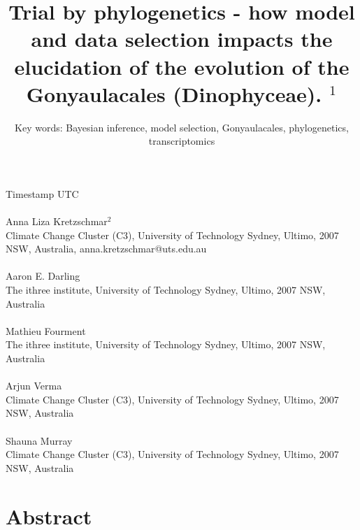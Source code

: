 \documentclass[12pt]{article}
\title{Trial by phylogenetics - how model and data selection impacts the elucidation of the evolution of the Gonyaulacales (Dinophyceae). $^{1}$}
\author{Key words: Bayesian inference, model selection, Gonyaulacales, phylogenetics, transcriptomics}
\date{}
\begin{document}
\maketitle

Timestamp \DTMnow UTC

\paragraph{}Anna Liza Kretzschmar$^{2}$\\
Climate Change Cluster (C3), University of Technology Sydney, Ultimo, 2007 NSW, Australia, anna.kretzschmar@uts.edu.au
\paragraph{}Aaron E. Darling \\
The ithree institute, University of Technology Sydney, Ultimo, 2007 NSW, Australia
\paragraph{}Mathieu Fourment \\
The ithree institute, University of Technology Sydney, Ultimo, 2007 NSW, Australia
\paragraph{}Arjun Verma\\
Climate Change Cluster (C3), University of Technology Sydney, Ultimo, 2007 NSW, Australia
\paragraph{}Shauna Murray\\ 
Climate Change Cluster (C3), University of Technology Sydney, Ultimo, 2007 NSW, Australia
\newpage
\section{Abstract}
\newpage
\end{document}
